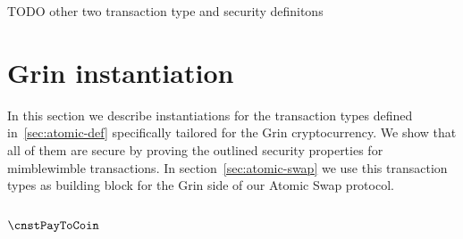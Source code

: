 TODO other two transaction type and security definitons

\section{Grin instantiation}\label{sec:atomic-inst}

In this section we describe instantiations for the transaction types defined in~\ref{sec:atomic-def} specifically tailored for the Grin cryptocurrency. We show that all of them are secure by proving the
outlined security properties for mimblewimble transactions. In section~\ref{sec:atomic-swap} we use this transaction types as building block for the Grin side of our Atomic Swap protocol.

\subsection{$\cnstPayToCoin$}


